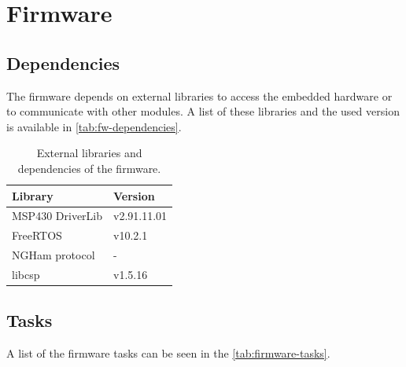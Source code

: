 %
%
%
%
%

%
%
%
%
%
%

\chapter{Firmware} \label{ch:firmware}

\section{Dependencies}

The firmware depends on external libraries to access the embedded hardware or to communicate with other modules. A list of these libraries and the used version is available in \autoref{tab:fw-dependencies}.

\begin{table}[!h]
    \centering
    \begin{tabular}{L{5cm}R{4cm}}
        \toprule[1.5pt]
        \textbf{Library}        & \textbf{Version} \\
        \midrule
            MSP430 DriverLib    & v2.91.11.01 \\
            FreeRTOS            & v10.2.1 \\
            NGHam protocol      & - \\
            libcsp              & v1.5.16 \\
        \bottomrule[1.5pt]
    \end{tabular}
    \caption{External libraries and dependencies of the firmware.}
    \label{tab:fw-dependencies}
\end{table}

\section{Tasks}

A list of the firmware tasks can be seen in the \autoref{tab:firmware-tasks}.

